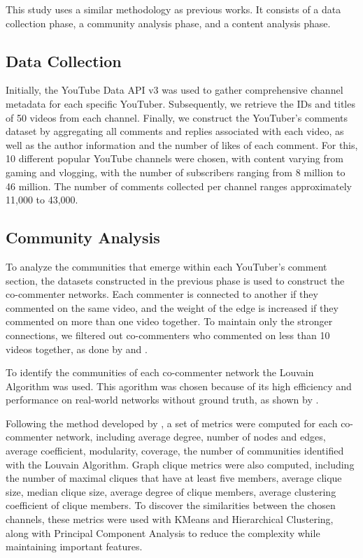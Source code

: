 \documentclass[12pt]{article}
\begin{document}
This study uses a similar methodology as previous works. It consists of a data collection phase, 
a community analysis phase, and a content analysis phase.


\subsection{Data Collection}

Initially, the YouTube Data API v3 was used to gather comprehensive channel metadata for each 
specific YouTuber. Subsequently, we retrieve the IDs and titles of 50 videos from each channel. 
Finally, we construct the YouTuber's comments dataset by aggregating all comments and replies 
associated with each video, as well as the author information and the number of likes of each comment. 
For this, 10 different popular YouTube channels were chosen, with content varying from gaming and 
vlogging, with the number of subscribers ranging from 8 million to 46 million. The number of comments
collected per channel ranges approximately 11,000 to 43,000.


\subsection{Community Analysis}

To analyze the communities that emerge within each YouTuber's comment section, the datasets constructed 
in the previous phase is used to construct the co-commenter networks. Each commenter is connected to
another if they commented on the same video, and the weight of the edge is increased if they commented
on more than one video together. To maintain only the stronger connections, we filtered out co-commenters
who commented on less than 10 videos together, as done by \cite{shajari2023} and \cite{kirdemir2023}. 

To identify the communities of each co-commenter network the Louvain Algorithm was used. This 
agorithm was chosen because of its high efficiency and performance on real-world networks
without ground truth, as shown by \cite{YOU2020104822}.

Following the method developed by \cite{kirdemir2023}, a set of metrics were computed 
for each co-commenter network, including average degree, number of nodes and edges, average coefficient,
modularity, coverage, the number of communities identified with the Louvain Algorithm. Graph clique 
metrics were also computed, including the number of maximal cliques that have at least five members, 
average clique size, median clique size, average degree of clique members, average clustering coefficient
of clique members. To discover the similarities between the chosen channels, these metrics were used
with KMeans and Hierarchical Clustering, along with Principal Component Analysis to reduce the complexity
while maintaining important features.
\end{document}
